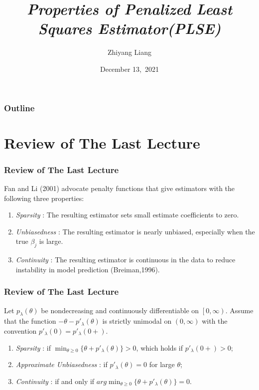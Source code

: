 \documentclass{beamer}
\title{ \emph{Properties of Penalized Least Squares Estimator(PLSE)}}
\subtitle{}
\author[Zhiyang Liang \emph{}] %
{Zhiyang Liang}
\institute[School of Data Science] %
{
  School of Data Science\\
  Fudan University
}
\date[December 13] %
{December 13,\ 2021}
\begin{document}
\newcommand{\SubItem}[1]{
    {\setlength\itemindent{15pt} \item[-] #1}
}

\begin{frame}[plain] %
  \titlepage
\end{frame}

\begin{frame}
    \frametitle{Outline}
    \tableofcontents[currentsection]
\end{frame}
\section{Review of The Last Lecture}
\begin{frame}
	\frametitle{Review of The Last Lecture}
Fan and Li (2001) advocate penalty functions that give estimators with the following three properties:
  \begin{enumerate}
  	\item \emph{Sparsity} : The resulting estimator sets small estimate coefficients to zero.
  	\item \emph{Unbiasedness} : The resulting estimator is nearly unbiased, especially when the true $\beta_j$ is large.
  	\item \emph{Continuity} : The resulting estimator is continuous in the data to reduce instability in model prediction (Breiman,1996).

  \end{enumerate}
\end{frame}
\begin{frame}
	\frametitle{Review of The Last Lecture}
	Let $p_\lambda(\theta)$ be nondecreasing and continuously differentiable on $\left [ 0,\infty \right ) $. Assume that the function 
	$-\theta -p'_\lambda(\theta)$ is strictly unimodal on $\left ( 0,\infty \right ) $ with the convention $p'_\lambda(0) = p'_\lambda(0+)$. 
	\begin{enumerate}
		\item \emph{Sparsity} : if $\min_{\theta\geq 0 }\{\theta+p'_\lambda(\theta)\} > 0$, which holds if $p'_\lambda(0+) > 0$;
		\item \emph{Approximate Unbiasedness} : if $p'_\lambda(\theta) =0 $ for large $\theta$;
		\item \emph{Continuity} : if and only if $arg\min_{\theta\geq 0}\{\theta+p'_\lambda(\theta)\} = 0$.
  
	\end{enumerate}
\end{frame}
\end{document}
